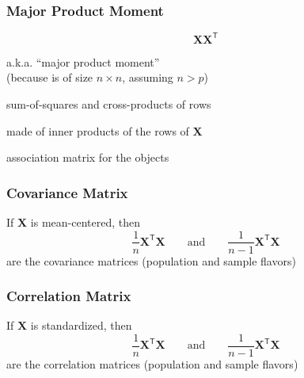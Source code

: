 \documentclass[12pt]{beamer}\usepackage[]{graphicx}\usepackage[]{color}
\begin{document}
\begin{frame}
\frametitle{Major Product Moment}

{\Large
$$
\mathbf{X X^\mathsf{T}}
$$ 
}

\bi
  \item a.k.a. ``major product moment'' \\
  {\lolit (because is of size $n \times n$, assuming $n > p$)}
  \item sum-of-squares and cross-products of rows
  \item made of inner products of the rows of $\mathbf{X}$
  \item association matrix for the objects
\ei

\end{frame}


\begin{frame}
\frametitle{Covariance Matrix}

If $\mathbf{X}$ is mean-centered, then
{\large
$$
\frac{1}{n} \mathbf{X^\mathsf{T} X}  \qquad \text{and} \qquad \frac{1}{n-1} \mathbf{X^\mathsf{T} X}
$$ 
}
are the covariance matrices (population and sample flavors)

\end{frame}


\begin{frame}
\frametitle{Correlation Matrix}

If $\mathbf{X}$ is standardized, then
{\large
$$
\frac{1}{n} \mathbf{X^\mathsf{T} X}  \qquad \text{and} \qquad \frac{1}{n-1} \mathbf{X^\mathsf{T} X}
$$ 
}
are the correlation matrices (population and sample flavors)


\end{frame}

\end{document}
